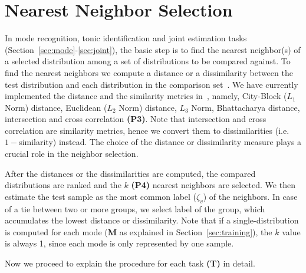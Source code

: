 \documentclass{sig-alternate}
\begin{document}
\section{Nearest Neighbor Selection}\label{sec:distance}
In mode recognition, tonic identification and joint estimation tasks (Section~\ref{sec:mode}-\ref{sec:joint}), the basic step is to find the nearest neighbor(s) of a selected distribution among a set of distributions to be compared against. To find the nearest neighbors we compute a distance or a dissimilarity between the test distribution and each distribution in the comparison set~\cite{distance}. We have currently implemented the distance and the similarity metrics in~\cite{bozkurt_makam, chordia}, namely, City-Block ($L_1$ Norm) distance, Euclidean ($L_2$ Norm) distance, $L_3$ Norm, Bhattacharya distance, intersection and cross correlation {\bf (P3)}. Note that intersection and cross correlation are similarity metrics, hence we convert them to dissimilarities (i.e. $1 - $similarity) instead. The choice of the distance or dissimilarity measure plays a crucial role in the neighbor selection.

After the distances or the dissimilarities are computed, the compared distributions are ranked and the $k$ {\bf (P4)} nearest neighbors are selected. We then estimate the test sample as the most common label ($\zeta_v$) of the neighbors. In case of a tie between two or more groups, we select label of the group, which accumulates the lowest distance or dissimilarity. Note that if a single-distribution is computed for each mode ({\bf M} as explained in Section~\ref{sec:training}), the $k$ value is always 1, since each mode is only represented by one sample.

Now we proceed to explain the procedure for each task {\bf(T)} in detail.
\end{document}
